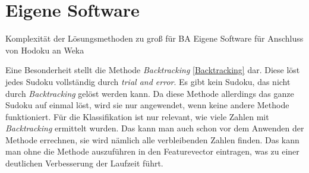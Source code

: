 \section{Eigene Software}
\label{Eigene_Software}
Komplexität der Lösungsmethoden zu groß für BA
Eigene Software für Anschluss von Hodoku an Weka

 Eine Besonderheit stellt die Methode \textit{Backtracking} \ref{Backtracking} dar. Diese löst jedes Sudoku vollständig durch \textit{trial and error}. Es gibt kein Sudoku, das nicht durch \textit{Backtracking} gelöst werden kann. Da diese Methode allerdings das ganze Sudoku auf einmal löst, wird sie nur angewendet, wenn keine andere Methode funktioniert. Für die Klassifikation ist nur relevant, wie viele Zahlen mit \textit{Backtracking} ermittelt wurden. Das kann man auch schon vor dem Anwenden der Methode errechnen, sie wird nämlich alle verbleibenden Zahlen finden. Das kann man ohne die Methode auszuführen in den Featurevector eintragen, was zu einer deutlichen Verbesserung der Laufzeit führt.